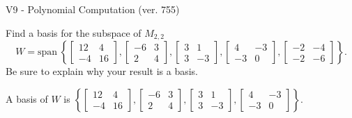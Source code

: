 \begin{exercise}
  \begin{exerciseTitle}V9 - Polynomial Computation (ver. 755)\end{exerciseTitle}
  \begin{exerciseStatement}
    Find a basis for the subspace of \(M_{2,2}\) 
\[W=\mathrm{span}\ \left\{\left[\begin{array}{cc}
12 & 4 \\
-4 & 16
\end{array}\right] , \left[\begin{array}{cc}
-6 & 3 \\
2 & 4
\end{array}\right] , \left[\begin{array}{cc}
3 & 1 \\
3 & -3
\end{array}\right] , \left[\begin{array}{cc}
4 & -3 \\
-3 & 0
\end{array}\right] , \left[\begin{array}{cc}
-2 & -4 \\
-2 & -6
\end{array}\right]\right\}.\]
 Be sure to explain why your result is a basis.


  \end{exerciseStatement}
  \begin{exerciseAnswer}
   A basis of \(W\) is  \(\left\{\left[\begin{array}{cc}
12 & 4 \\
-4 & 16
\end{array}\right] , \left[\begin{array}{cc}
-6 & 3 \\
2 & 4
\end{array}\right] , \left[\begin{array}{cc}
3 & 1 \\
3 & -3
\end{array}\right] , \left[\begin{array}{cc}
4 & -3 \\
-3 & 0
\end{array}\right]\right\}\).
  


  \end{exerciseAnswer}
\end{exercise}